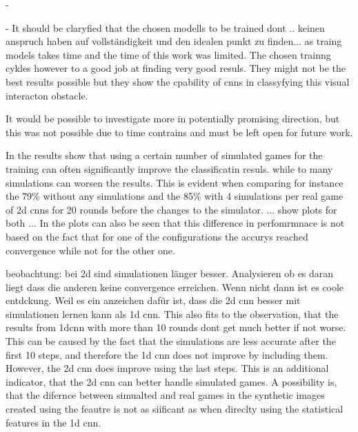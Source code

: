 - 

- It should be claryfied that the chosen modells to be trained dont .. keinen anspruch haben auf vollständigkeit und den idealen punkt zu finden... as traing models takes time and the time of this work was limited. The chosen trainng cykles however to a good job at finding very good resuls. They might not be the best results possible but they show the cpability of cnns in classyfying this visual interacton obstacle. 

 

It would be possible to investigate more in potentially promising direction, but this was not possible due to time contrains and must be left open for future work. 

In the results show that using a certain number of simulated games for the training can often significantly improve the classificatin resuls.  while to many simulations can worsen the results. This is evident when comparing for instance the 79\% without any simulations and the 85\% with 4 simulations per real game of 2d cnns for 20 rounds before the changes to the simulator. 
... show plots for both ...
In the plots can also be seen that this difference in perfomrmnace is not based on the fact that for one of the configurations the accurys reached convergence while not for the other one. 

beobachtung: bei 2d sind simulationen länger besser. Analysieren ob es daran liegt dass die anderen keine convergence erreichen. Wenn nicht dann ist es coole entdckung. Weil es ein anzeichen dafür ist, dass die 2d cnn besser mit simulationen lernen kann als 1d cnn. This also fits to the observation, that the results from 1dcnn with more than 10 rounds dont get much better if not worse. This can be caused by the fact that the simulations are less accurate after the first 10 steps, and therefore the 1d cnn does not improve by including them. However, the 2d cnn does improve using the last steps. This is an additional indicator, that the 2d cnn can better handle simulated games. A possibility is, that the difernce between simualted and real games in the synthetic images created using the feautre is not as siificant as when direclty using the statistical features in the 1d cnn. 

